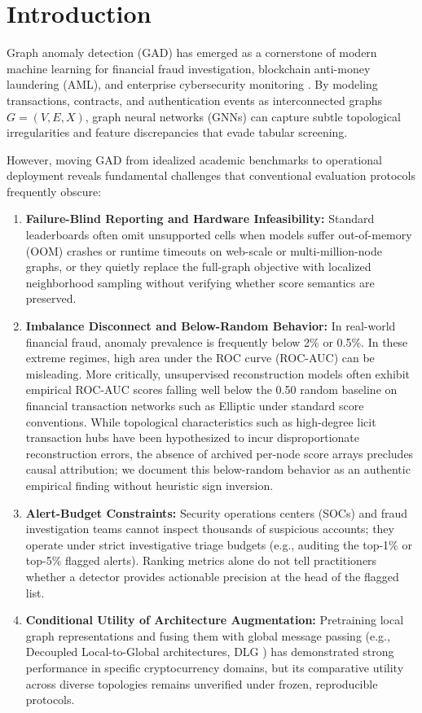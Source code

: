 \documentclass[applsci,article,submit,moreauthors,pdftex]{Definitions/mdpi}
\begin{document}
\section{Introduction}
\label{sec:introduction}
Graph anomaly detection (GAD) has emerged as a cornerstone of modern machine learning for financial fraud investigation, blockchain anti-money laundering (AML), and enterprise cybersecurity monitoring \cite{ma2023survey,qiao2025survey,dilini2026comprehensive}. By modeling transactions, contracts, and authentication events as interconnected graphs $G=(V, E, X)$, graph neural networks (GNNs) can capture subtle topological irregularities and feature discrepancies that evade tabular screening.

However, moving GAD from idealized academic benchmarks to operational deployment reveals fundamental challenges that conventional evaluation protocols frequently obscure:
\begin{enumerate}
    \item \textbf{Failure-Blind Reporting and Hardware Infeasibility:} Standard leaderboards often omit unsupported cells when models suffer out-of-memory (OOM) crashes or runtime timeouts on web-scale or multi-million-node graphs, or they quietly replace the full-graph objective with localized neighborhood sampling without verifying whether score semantics are preserved.
    \item \textbf{Imbalance Disconnect and Below-Random Behavior:} In real-world financial fraud, anomaly prevalence is frequently below 2\% or 0.5\%. In these extreme regimes, high area under the ROC curve (ROC-AUC) can be misleading. More critically, unsupervised reconstruction models often exhibit empirical ROC-AUC scores falling well below the 0.50 random baseline on financial transaction networks such as Elliptic under standard score conventions. While topological characteristics such as high-degree licit transaction hubs have been hypothesized to incur disproportionate reconstruction errors, the absence of archived per-node score arrays precludes causal attribution; we document this below-random behavior as an authentic empirical finding without heuristic sign inversion.
    \item \textbf{Alert-Budget Constraints:} Security operations centers (SOCs) and fraud investigation teams cannot inspect thousands of suspicious accounts; they operate under strict investigative triage budgets (e.g., auditing the top-1\% or top-5\% flagged alerts). Ranking metrics alone do not tell practitioners whether a detector provides actionable precision at the head of the flagged list.
    \item \textbf{Conditional Utility of Architecture Augmentation:} Pretraining local graph representations and fusing them with global message passing (e.g., Decoupled Local-to-Global architectures, DLG \cite{park2026dlg}) has demonstrated strong performance in specific cryptocurrency domains, but its comparative utility across diverse topologies remains unverified under frozen, reproducible protocols.
\end{enumerate}
\end{document}
